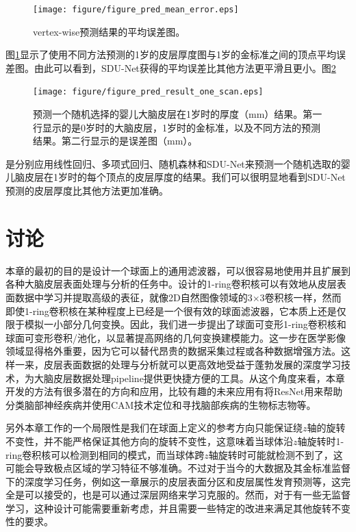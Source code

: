 \begin{figure}[h]
	\centering
	\texttt{[image: figure/figure\_pred\_mean\_error.eps]}
	\caption{vertex-wise预测结果的平均误差图。}
	\label{fig:thickness_prediction_mean_error}
\end{figure}

图\ref{fig:thickness_prediction_mean_error}显示了使用不同方法预测的1岁的皮层厚度图与1岁的金标准之间的顶点平均误差图。由此可以看到，SDU-Net获得的平均误差比其他方法更平滑且更小。图\ref{fig:thickness_prediction_result_one_scan}
\begin{figure}[h]
	\centering
	\texttt{[image: figure/figure\_pred\_result\_one\_scan.eps]}
	\caption{预测一个随机选择的婴儿大脑皮层在1岁时的厚度（mm）结果。第一行显示的是0岁时的大脑皮层，1岁时的金标准，以及不同方法的预测结果。第二行显示的是误差图（mm）。}
	\label{fig:thickness_prediction_result_one_scan}
\end{figure}
是分别应用线性回归、多项式回归、随机森林和SDU-Net来预测一个随机选取的婴儿脑皮层在1岁时的每个顶点的皮层厚度的结果。我们可以很明显地看到SDU-Net预测的皮层厚度比其他方法更加准确。


\section{讨论}
本章的最初的目的是设计一个球面上的通用滤波器，可以很容易地使用并且扩展到各种大脑皮层表面处理与分析的任务中。设计的1-ring卷积核可以有效地从皮层表面数据中学习并提取高级的表征，就像2D自然图像领域的3$\times$3卷积核一样，然而即使1-ring卷积核在某种程度上已经是一个很有效的球面滤波器，它本质上还是仅限于模拟一小部分几何变换。因此，我们进一步提出了球面可变形1-ring卷积核和球面可变形卷积/池化，以显著提高网络的几何变换建模能力。这一步在医学影像领域显得格外重要，因为它可以替代昂贵的数据采集过程或各种数据增强方法。这样一来，皮层表面数据的处理与分析就可以更高效地受益于蓬勃发展的深度学习技术，为大脑皮层数据处理pipeline提供更快捷方便的工具。从这个角度来看，本章开发的方法有很多潜在的方向和应用，比较有趣的未来应用有将ResNet\cite{he2016deep}用来帮助分类脑部神经疾病并使用CAM技术\cite{zhou2016learning}定位和寻找脑部疾病的生物标志物等。

另外本章工作的一个局限性是我们在球面上定义的参考方向只能保证绕$z$轴的旋转不变性，并不能严格保证其他方向的旋转不变性，这意味着当球体沿$z$轴旋转时1-ring卷积核可以检测到相同的模式，而当球体跨$z$轴旋转时可能就检测不到了，这可能会导致极点区域的学习特征不够准确。不过对于当今的大数据及其金标准监督下的深度学习任务，例如这一章展示的皮层表面分区和皮层属性发育预测等，这完全是可以接受的，也是可以通过深层网络来学习克服的。然而，对于有一些无监督学习，这种设计可能需要重新考虑，并且需要一些特定的改进来满足其他旋转不变性的要求。

